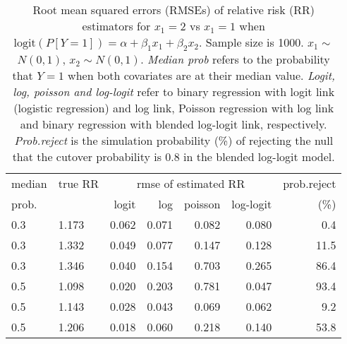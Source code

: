 \documentclass[12pt,a4paper]{article}
\begin{document}
\begin{table}[H] 
\small\sf\centering 
\caption{Root mean squared errors (RMSEs) of relative risk (RR) estimators for $x_1=2$ vs $x_1=1$ when $\mbox{logit}(P[Y=1])=\alpha+\beta_1 x_1 + \beta_2 x_2$. Sample size is 1000. $x_1 \sim $$N(0,1)$, $x_2 \sim N(0,1)$. {\it Median prob} refers to the probability that $Y=1$ when both covariates are at their median value. {\it Logit, log, poisson and log-logit} refer to binary regression with logit link (logistic regression) and log link, Poisson regression with log link and binary regression with blended log-logit link, respectively. {\it Prob.reject} is the simulation probability (\%) of rejecting the null that the cutover probability is $0.8$ in the blended log-logit model.} 
\begin{tabular}{llrrrrr} 
\toprule 
median & true RR & \multicolumn{4}{c}{rmse of estimated RR} & prob.reject \\ 
prob. & & logit & log & poisson & log-logit  & (\%) \\ \midrule 
0.3 & 1.173 & 0.062 & 0.071 & 0.082 & 0.080 &  0.4 \\  
0.3 & 1.332 & 0.049 & 0.077 & 0.147 & 0.128 & 11.5 \\  
0.3 & 1.346 & 0.040 & 0.154 & 0.703 & 0.265 & 86.4 \\  
0.5 & 1.098 & 0.020 & 0.203 & 0.781 & 0.047 & 93.4 \\  
0.5 & 1.143 & 0.028 & 0.043 & 0.069 & 0.062 &  9.2 \\  
0.5 & 1.206 & 0.018 & 0.060 & 0.218 & 0.140 & 53.8 \\  
\bottomrule 
\end{tabular} 
\end{table} 
\end{document}
